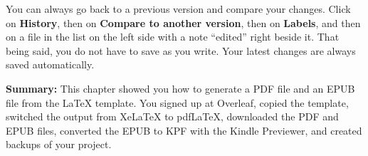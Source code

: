 You can always go back to a previous version and compare your changes. Click on \textbf{History}, then on \textbf{Compare to another version}, then on \textbf{Labels}, and then on a file in the list on the left side with a note ``edited'' right beside it. That being said, you do not have to save as you write. Your latest changes are always saved automatically.

\textbf{Summary:} This chapter showed you how to generate a PDF file and an EPUB file from the LaTeX template. You signed up at Overleaf, copied the template, switched the output from XeLaTeX to pdfLaTeX, downloaded the PDF and EPUB files, converted the EPUB to KPF with the Kindle Previewer, and created backups of your project.
